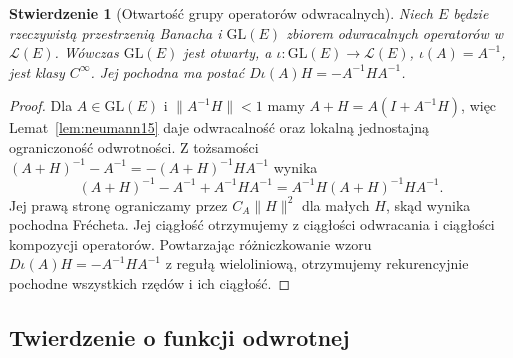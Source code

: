 \documentclass[11pt,a4paper]{article}
\numberwithin{equation}{section}
\theoremstyle{plain}
\newtheorem{stwierdzenie}[twierdzenie]{Stwierdzenie}
\theoremstyle{definition}
\theoremstyle{remark}
\begin{document}
\begin{stwierdzenie}[Otwartość grupy operatorów odwracalnych]
\label{prop:inverse-operator15}
Niech $E$ będzie rzeczywistą przestrzenią Banacha i $\mathrm{GL}(E)$ zbiorem odwracalnych operatorów w $\mathcal L(E)$. Wówczas $\mathrm{GL}(E)$ jest otwarty, a $\iota:\mathrm{GL}(E)\to\mathcal L(E)$, $\iota(A)=A^{-1}$, jest klasy $C^\infty$. Jej pochodna ma postać
$D\iota(A)H=-A^{-1}HA^{-1}$.
\end{stwierdzenie}
\begin{proof}
Dla $A\in\mathrm{GL}(E)$ i $\|A^{-1}H\|<1$ mamy $A+H=A(I+A^{-1}H)$, więc Lemat~\ref{lem:neumann15} daje odwracalność oraz lokalną jednostajną ograniczoność odwrotności. Z tożsamości
$(A+H)^{-1}-A^{-1}=-(A+H)^{-1}HA^{-1}$ wynika
\[
(A+H)^{-1}-A^{-1}+A^{-1}HA^{-1}
=A^{-1}H(A+H)^{-1}HA^{-1}.
\]
Jej prawą stronę ograniczamy przez $C_A\|H\|^2$ dla małych $H$, skąd wynika pochodna Frécheta. Jej ciągłość otrzymujemy z ciągłości odwracania i ciągłości kompozycji operatorów. Powtarzając różniczkowanie wzoru $D\iota(A)H=-A^{-1}HA^{-1}$ z regułą wieloliniową, otrzymujemy rekurencyjnie pochodne wszystkich rzędów i ich ciągłość.
\end{proof}

\subsection{Twierdzenie o funkcji odwrotnej}
\end{document}
